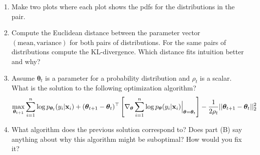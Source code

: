 \documentclass[11pt]{article}
\begin{document}
\begin{enumerate}[label=(\Alph*)]

    \item Make two plots where each plot shows the pdfs for the distributions in the pair.

    \item Compute the Euclidean distance between the parameter vector $(\textrm{mean}, \textrm{variance})$ for both pairs of distributions.
    For the same pairs of distributions compute the KL-divergence. Which distance fits intuition better and why?

    \item Assume $\boldsymbol \theta_t$ is a parameter for a probability distribution and $\rho_t$ is a scalar. What is the solution to the following optimization algorithm?
        \begin{align*}
            \max_{\boldsymbol \theta_{t+1}} \sum_{i=1}^n \log p_{\boldsymbol \theta_{t}}(y_i | {\mathbf x}_i) + (\boldsymbol \theta_{t+1} - \boldsymbol \theta_t)^\top \left[\nabla_{\boldsymbol \theta} \sum_{i=1}^n \log p_{\boldsymbol \theta}(y_i | {\mathbf x}_i) \Bigr|_{\boldsymbol \theta = \boldsymbol \theta_t}\right] - \frac{1}{2\rho_t}||\boldsymbol \theta_{t+1} - \boldsymbol \theta_t||_2^2
        \end{align*}
        
    \item What algorithm does the previous solution correspond to? Does part (B) say anything about why this algorithm might be suboptimal?
    How would you fix it?
\end{enumerate}
\end{document}
